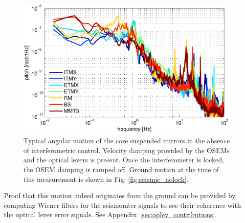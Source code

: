 \begin{figure}
\begin{centering}
\includegraphics[width=1.0\columnwidth]{figures/seismic_mirrormotion.pdf}
\caption[Typical angular motion of the core suspended mirrors in the
  absence of interferometric control]{Typical angular motion of the core suspended mirrors in the
  absence of interferometric control. Velocity damping provided by the
  OSEMs and the optical levers is present. Once the interferometer is locked, the OSEM damping is ramped off. Ground motion at the time of this measurement is shown in Fig. \ref{fig:seismic_nolock}.}
\label{fig:seismicMirror}
\end{centering}
\end{figure}


Proof that this motion indeed originates from the ground can be provided by computing Wiener filters for the seismomter signals to see their coherence with the optical lever error signals. See Appendix~\ref{sec:oplev_contributions}.







